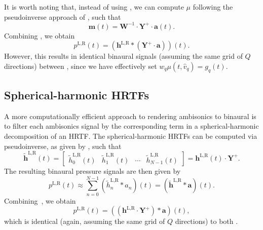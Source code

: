 It is worth noting that, instead of using , we can compute $\mu$ following the pseudoinverse approach of , such that
\begin{equation}\label{eq:02_Acoustical_Theory:A2mu_Pinv}
\mathbf{m}(t) = \mathbf{W}^{-1} \cdot \mathbf{Y}^{+} \cdot \mathbf{a}(t).
\end{equation}
Combining , we obtain
\begin{equation}\label{eq:02_Acoustical_Theory:PW_Pinv_Binaural_Matrix}
p^{\text{L,R}}(t) = \left( \mathbf{h}^{\text{L,R}} \ast \left( \mathbf{Y}^{+} \cdot \mathbf{a} \right) \right) (t).
\end{equation}
However, this results in identical binaural signals (assuming the same grid of $Q$ directions) between , since we have effectively set $w_q \mu(t,\hat{v}_q) = g_q(t)$.

\subsection{Spherical-harmonic HRTFs}\label{sec:02_Acoustical_Theory:SH_Binaural}
A more computationally efficient approach to rendering ambisonics to binaural is to filter each ambisonics signal by the corresponding term in a spherical-harmonic decomposition of an HRTF.
The spherical-harmonic HRTFs can be computed via pseudoinverse, as given by \citet[section IV]{RafaelyAvni2010}, such that
\begin{equation}\label{eq:02_Acoustical_Theory:SH_HRTFs}
\mathbf{\tilde{h}}^{\text{L,R}}(t) = 
\begin{bmatrix}
\tilde{h}_{0}^{\text{L,R}}(t) & \tilde{h}_{1}^{\text{L,R}}(t) & \cdots & \tilde{h}_{N-1}^{\text{L,R}}(t)
\end{bmatrix}
 = \mathbf{h}^{\text{L,R}}(t) \cdot \mathbf{Y}^{+}.
\end{equation}
The resulting binaural pressure signals are then given by
\begin{equation}\label{eq:02_Acoustical_Theory:SH_Binaural}
p^{\text{L,R}}(t) \approx \sum_{n=0}^{N-1} \left( \tilde{h}_n^{\text{L,R}} \ast a_n \right) (t)
 = \left( \mathbf{\tilde{h}}^{\text{L,R}} \ast \mathbf{a} \right) (t).
\end{equation}
Combining~, we obtain
\begin{equation}\label{eq:02_Acoustical_Theory:SH_Binaural_Matrix}
p^{\text{L,R}}(t) = \left( \left( \mathbf{h}^{\text{L,R}} \cdot \mathbf{Y}^{+} \right) \ast \mathbf{a} \right) (t),
\end{equation}
which is identical (again, assuming the same grid of $Q$ directions) to both .